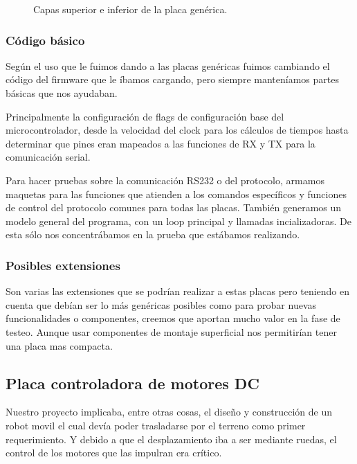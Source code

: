 \begin{figure}
	\caption{Capas superior e inferior de la placa gen\'erica.}
	\label{hF_placa_gen_capas}
\end{figure}

\subsubsection{C\'odigo b\'asico}
\label{h_placas_generica_codigo}

Seg\'un el uso que le fuimos dando a las placas gen\'ericas fuimos cambiando el c\'odigo del firmware que le
\'ibamos cargando, pero siempre manten\'iamos partes b\'asicas que nos ayudaban.

Principalmente la configuraci\'on de flags de configuraci\'on base del microcontrolador, desde la velocidad
del clock para los c\'alculos de tiempos hasta determinar que pines eran mapeados a las funciones de RX y TX
para la comunicaci\'on serial.

Para hacer pruebas sobre la comunicaci\'on RS232 o del protocolo, armamos maquetas para las funciones que
atienden a los comandos espec\'ificos y funciones de control del protocolo comunes para todas las placas.
Tambi\'en generamos un modelo general del programa, con un loop principal y llamadas incializadoras.
De esta s\'olo nos concentr\'abamos en la prueba que est\'abamos realizando.

\subsubsection{Posibles extensiones}
\label{h_placas_generica_extensiones}

Son varias las extensiones que se podr\'ian realizar a estas placas pero teniendo en cuenta que deb\'ian ser
lo m\'as gen\'ericas posibles como para probar nuevas funcionalidades o componentes, creemos que aportan mucho
valor en la fase de testeo.
Aunque usar componentes de montaje superficial nos permitir\'ian tener una placa mas compacta.

\subsection{Placa controladora de motores DC}
\label{h_placas_motorDC}

Nuestro proyecto implicaba, entre otras cosas, el dise\~no y construcci\'on de un robot movil el cual dev\'ia poder
trasladarse por el terreno como primer requerimiento.
Y debido a que el desplazamiento iba a ser mediante ruedas, el control de los motores que las impulran era cr\'itico.

